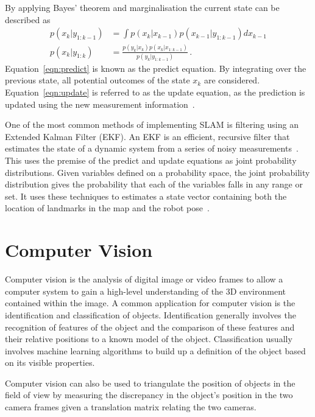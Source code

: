 By applying Bayes' theorem and marginalisation the current state can be described as
\begin{align}
\label{eqn:predict}
p(x_{k} | y_{1:k-1}) & = \int p(x_{k}|x_{k-1}) p(x_{k-1} | y_{1:k-1}) dx_{k-1} \\
\label{eqn:update}
p(x_{k} | y_{1:k}) &= \frac{ p(y_{k}|x_{k})p(x_{k}|x_{1:k-1})}{ p(y_{k}|y_{1:k-1})}\,.
\end{align}
Equation~\ref{eqn:predict} is known as the predict equation. By integrating over
the previous state, all potential outcomes of the state $x_k$ are
considered. Equation~\ref{eqn:update} is referred to as the update equation,
as the prediction is updated using the new measurement information~\cite{kam1997sensorfusion}.

One of the most common methods of implementing SLAM is filtering using an
Extended Kalman Filter (EKF). An EKF is an efficient, recursive filter
that estimates the state of a dynamic system from a series of noisy measurements~\cite{fox2003bayesian}.
This uses the premise of the predict and update equations as joint probability
distributions. Given variables defined on a probability space, the joint
probability distribution gives the probability that each of the variables falls in any
range or set. It uses these techniques to estimates a state vector containing
both the location of landmarks in the map and the robot pose~\cite{huang2007convergence}.


\section{Computer Vision}\label{litreview/cv}
Computer vision is the analysis of digital image or video frames to allow a computer
system to gain a high-level understanding of the 3D environment contained within
the image\cite{CVBallard}. A common application for computer vision is the identification and classification
of objects. Identification generally involves the recognition of features of the
object and the comparison of these features and their relative positions to a
known model of the object. Classification usually involves machine learning
algorithms to build up a definition of the object based on its visible properties\cite{CVpaoletti2018new}.

Computer vision can also be used to triangulate the position of objects in the
field of view by measuring the discrepancy in the object's position in the two camera
frames given a translation matrix relating the two cameras.


